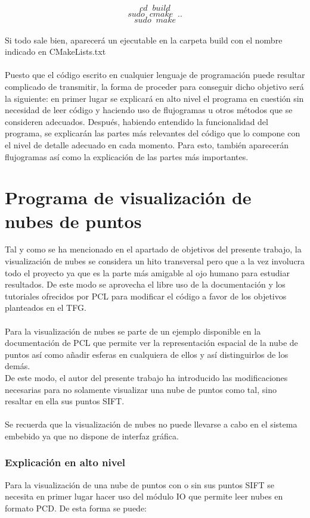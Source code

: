 $$cd \;\; build$$
$$sudo \;\; cmake \;\; ..$$
$$sudo \;\; make$$
\\
Si todo sale bien, aparecerá un ejecutable en la carpeta build con el nombre indicado en CMakeLists.txt
\\
\\
Puesto que el código escrito en cualquier lenguaje de programación puede resultar complicado de transmitir, la forma de proceder para conseguir dicho objetivo será la siguiente: en primer lugar se explicará en alto nivel el programa en cuestión sin necesidad de leer código y haciendo uso de flujogramas u otros métodos que se consideren adecuados. Después, habiendo entendido la funcionalidad del programa, se explicarán las partes más relevantes del código que lo compone con el nivel de detalle adecuado en cada momento. Para esto, también aparecerán flujogramas así como la explicación de las partes más importantes.

 
\section{Programa de visualización de nubes de puntos}\label{visualizacion}
Tal y como se ha mencionado en el apartado de objetivos del presente trabajo, la visualización de nubes se considera un hito transversal pero que a la vez involucra todo el proyecto ya que es la parte más amigable al ojo humano para estudiar resultados. De este modo se aprovecha el libre uso de la documentación y los tutoriales ofrecidos por PCL\cite{modulo_io} para modificar el código a favor de los objetivos planteados en el TFG.
\\
\\
Para la visualización de nubes se parte de un ejemplo disponible en la documentación de PCL\cite{ejemplo_visualizacion} que permite ver la representación espacial de la nube de puntos así como añadir esferas en cualquiera de ellos y así distinguirlos de los demás.
\\
De este modo, el autor del presente trabajo ha introducido las modificaciones necesarias para no solamente visualizar una nube de puntos como tal, sino resaltar en ella sus puntos SIFT.
\\
\\
Se recuerda que la visualización de nubes no puede llevarse a cabo en el sistema embebido ya que no dispone de interfaz gráfica.

\subsubsection{Explicación en alto nivel}
Para la visualización de una nube de puntos con o sin sus puntos SIFT se necesita en primer lugar hacer uso del módulo IO que permite leer nubes en formato PCD. De esta forma se puede:

